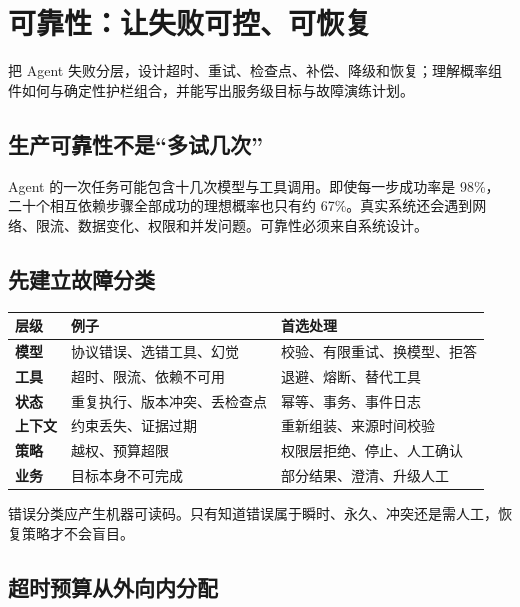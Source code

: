 \chapter{可靠性：让失败可控、可恢复}
\label{chap:reliability}

\begin{takeaway}[学习目标]
把 Agent 失败分层，设计超时、重试、检查点、补偿、降级和恢复；理解概率组件如何与确定性护栏组合，并能写出服务级目标与故障演练计划。
\end{takeaway}

\section{生产可靠性不是“多试几次”}

Agent 的一次任务可能包含十几次模型与工具调用。即使每一步成功率是 98\%，二十个相互依赖步骤全部成功的理想概率也只有约 67\%。真实系统还会遇到网络、限流、数据变化、权限和并发问题。可靠性必须来自系统设计。

\section{先建立故障分类}

\begin{table}[htbp]
\centering
\small
\begin{tabularx}{\textwidth}{>{\bfseries}p{} X X}
\toprule
层级 & 例子 & 首选处理 \\
\midrule
模型 & 协议错误、选错工具、幻觉 & 校验、有限重试、换模型、拒答 \\
工具 & 超时、限流、依赖不可用 & 退避、熔断、替代工具 \\
状态 & 重复执行、版本冲突、丢检查点 & 幂等、事务、事件日志 \\
上下文 & 约束丢失、证据过期 & 重新组装、来源时间校验 \\
策略 & 越权、预算超限 & 权限层拒绝、停止、人工确认 \\
业务 & 目标本身不可完成 & 部分结果、澄清、升级人工 \\
\bottomrule
\end{tabularx}
\end{table}

错误分类应产生机器可读码。只有知道错误属于瞬时、永久、冲突还是需人工，恢复策略才不会盲目。

\section{超时预算从外向内分配}

